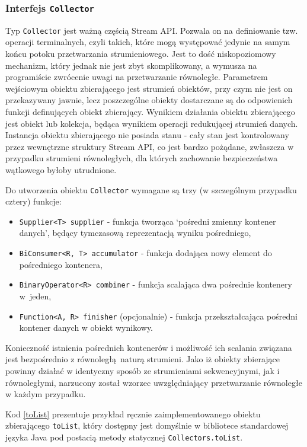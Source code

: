 \documentclass[12pt,twoside,openright]{extarticle}
\begin{document}
\subsubsection{Interfejs \texttt{Collector}}

    Typ \texttt{Collector} jest ważną częścią Stream API. Pozwala on na definiowanie tzw. operacji terminalnych, czyli takich, które mogą występować jedynie na samym końcu potoku przetwarzania strumieniowego. Jest to dość niskopoziomowy mechanizm, który jednak nie jest zbyt skomplikowany, a wymusza na programiście zwrócenie uwagi na przetwarzanie równoległe. Parametrem wejściowym obiektu zbierającego jest strumień obiektów, przy czym nie jest on przekazywany jawnie, lecz poszczególne obiekty dostarczane są do odpowienich funkcji definujących obiekt zbierający. Wynikiem działania obiektu zbierającego jest obiekt lub kolekcja, będąca wynikiem operacji redukującej strumień danych. Instancja obiektu zbierającego nie posiada stanu - cały stan jest kontrolowany przez wewnętrzne struktury Stream API, co jest bardzo pożądane, zwłaszcza w przypadku strumieni równoległych, dla których zachowanie bezpieczeństwa wątkowego byłoby utrudnione.

    Do utworzenia obiektu \texttt{Collector} wymagane są trzy (w szczególnym przypadku cztery) funkcje:

\begin{itemize}
    \item \texttt{Supplier<T> supplier} - funkcja tworząca `pośredni zmienny kontener danych', będący tymczasową reprezentacją wyniku pośredniego,
    \item \texttt{BiConsumer<R, T> accumulator} - funkcja dodająca nowy element do pośredniego kontenera,
    \item \texttt{BinaryOperator<R> combiner} - funkcja scalająca dwa pośrednie kontenery w~jeden,
    \item \texttt{Function<A, R> finisher} (opcjonalnie) - funkcja przekształcająca pośredni kontener danych w obiekt wynikowy.
\end{itemize}

    Konieczność istnienia pośrednich kontenerów i możliwość ich scalania związana jest bezpośrednio z równoległą naturą strumieni. Jako iż obiekty zbierające powinny działać w identyczny sposób ze strumieniami sekwencyjnymi, jak i równoległymi, narzucony został wzorzec uwzględniający przetwarzanie równoległe w każdym przypadku.

    Kod \ref{toList} prezentuje przykład ręcznie zaimplementowanego obiektu zbierającego \texttt{toList}, który dostępny jest domyślnie w bibliotece standardowej języka Java pod postacią metody statycznej \texttt{Collectors.toList}.
\end{document}
